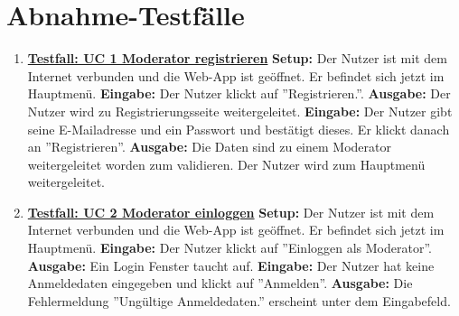 \section{Abnahme-Testfälle}
\begin{enumerate}
	\item \underline{\textbf{Testfall: UC 1 Moderator registrieren}} \linebreak
	\textbf{Setup:} Der Nutzer ist mit dem Internet verbunden und die Web-App ist geöffnet. Er befindet sich jetzt im Hauptmenü.\linebreak
	\textbf{Eingabe:} Der Nutzer klickt auf ''Registrieren.''.\linebreak
	\textbf{Ausgabe:} Der Nutzer wird zu Registrierungsseite weitergeleitet.\linebreak
	\textbf{Eingabe:} Der Nutzer gibt seine E-Mailadresse und ein Passwort und bestätigt dieses. Er klickt danach an ''Registrieren''. \linebreak
	\textbf{Ausgabe:} Die Daten sind zu einem Moderator weitergeleitet worden zum validieren.  Der Nutzer wird zum Hauptmenü weitergeleitet.
	
	\item \underline{\textbf{Testfall: UC 2 Moderator einloggen}} \linebreak
	\textbf{Setup:} Der Nutzer ist mit dem Internet verbunden und die Web-App ist geöffnet. Er befindet sich jetzt im Hauptmenü. \linebreak
	\textbf{Eingabe:} Der Nutzer klickt auf ''Einloggen als Moderator''. \linebreak
	\textbf{Ausgabe:} Ein Login Fenster taucht auf.\linebreak
	\textbf{Eingabe:} Der Nutzer hat keine Anmeldedaten eingegeben und klickt auf ''Anmelden''.\linebreak
	\textbf{Ausgabe:} Die Fehlermeldung ''Ungültige Anmeldedaten.'' erscheint unter dem Eingabefeld.
	

\end{enumerate}
